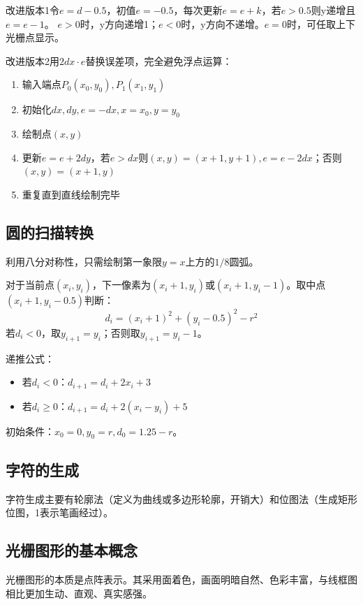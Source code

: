 \documentclass[12pt]{article}
\begin{document}
改进版本1令$e=d-0.5$，初值$e=-0.5$，每次更新$e = e + k$，若$e > 0.5$则y递增且$e = e - 1$。
$e>0$时，y方向递增1；$e<0$时，y方向不递增。$e=0$时，可任取上下光栅点显示。

改进版本2用$2dx \cdot e$替换误差项，完全避免浮点运算：

\begin{enumerate}
    \item 输入端点$P_0(x_0, y_0), P_1(x_1, y_1)$
    \item 初始化$dx, dy, e = -dx, x = x_0, y = y_0$
    \item 绘制点$(x, y)$
    \item 更新$e = e + 2dy$，若$e > dx$则$(x, y) = (x+1, y+1), e = e - 2dx$；否则$(x, y) = (x+1, y)$
    \item 重复直到直线绘制完毕
\end{enumerate}

\subsection{圆的扫描转换}

利用八分对称性，只需绘制第一象限$y=x$上方的$1/8$圆弧。

对于当前点$(x_i, y_i)$，下一像素为$(x_i+1, y_i)$或$(x_i+1, y_i-1)$。取中点$(x_i+1, y_i-0.5)$判断：
\[
d_i = (x_i+1)^2 + (y_i-0.5)^2 - r^2
\]
若$d_i < 0$，取$y_{i+1} = y_i$；否则取$y_{i+1} = y_i-1$。

递推公式：
\begin{itemize}
    \item 若$d_i < 0$：$d_{i+1} = d_i + 2x_i + 3$
    \item 若$d_i \ge 0$：$d_{i+1} = d_i + 2(x_i - y_i) + 5$
\end{itemize}
初始条件：$x_0 = 0, y_0 = r, d_0 = 1.25 - r$。

\subsection{字符的生成}

字符生成主要有轮廓法（定义为曲线或多边形轮廓，开销大）和位图法（生成矩形位图，1表示笔画经过）。

\subsection{光栅图形的基本概念}

光栅图形的本质是点阵表示。其采用面着色，画面明暗自然、色彩丰富，与线框图相比更加生动、直观、真实感强。
\end{document}
